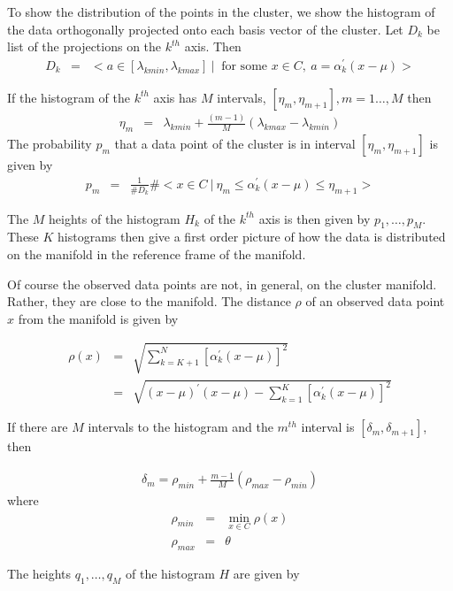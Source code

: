 To show the distribution of the points in the cluster, we show the histogram
of the data orthogonally projected onto each basis vector of the cluster.
Let $D_k$ be list of the projections on the $k^{th}$ axis. Then
\begin{eqnarray*}
D_k&=&< a\in [\lambda_{kmin},\lambda_{kmax}] \ | \ \mbox{ for some } x\in C,\ a=\alpha_k^\prime(x-\mu)>
\end{eqnarray*}

If the histogram of the $k^{th}$ axis has $M$ intervals, $[\eta_m,\eta_{m+1}], m=1\ldots,M$
then
\begin{eqnarray*}
\eta_m&=&\lambda_{kmin}+ \frac{(m-1)}{M}(\lambda_{kmax}-\lambda_{kmin})
\end{eqnarray*}
The probability $p_m$ that a data point of the cluster is in interval $[\eta_m,\eta_{m+1}]$
is given by
\begin{eqnarray*}
p_m&=&\frac{1}{\#D_k} \# < x\in C\ | \ \eta_m \le \alpha_k^\prime(x-\mu) \le \eta_{m+1}>
\end{eqnarray*}

The $M$ heights of the histogram $H_k$ of the $k^{th}$ axis is then given by
$p_1,\ldots,p_M$.
These $K$ histograms then give a first order picture of how the data is distributed
on the manifold in the reference frame of the manifold.

Of course the observed data points are not, in general, on the cluster manifold.
Rather, they are close to the manifold. The distance $\rho$ of an observed data point
$x$ from the manifold is given by

\begin{eqnarray*}
\rho(x)&=&\sqrt{\sum_{k=K+1}^N [\alpha_k^\prime (x-\mu)]^2}\\
&=& \sqrt{(x-\mu)^\prime(x-\mu)-\sum_{k=1}^K[\alpha_k^\prime (x-\mu)]^2}
\end{eqnarray*}

If there are $M$ intervals to the histogram and the $m^{th}$ interval
is $[\delta_m,\delta_{m+1}]$, then

\begin{eqnarray*}
\delta_m=\rho_{min}+\frac{m-1}{M}(\rho_{max}-\rho_{min})
\end{eqnarray*}
where
\begin{eqnarray*}
\rho_{min}&=&\min_{x\in C}\rho(x)\\
\rho_{max}&=&\theta
\end{eqnarray*}

The heights $q_1,\ldots,q_M$ of the histogram $H$ are given by


